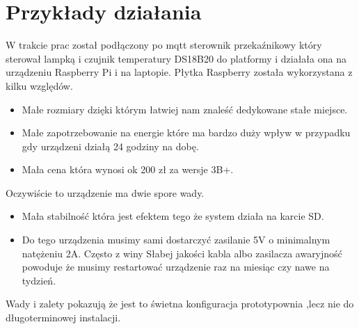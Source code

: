 \chapter{Przykłady działania}
W trakcie prac został podłączony po mqtt sterownik przekaźnikowy który sterował lampką i czujnik temperatury DS18B20 do platformy i działała ona na urządzeniu Raspberry Pi i na laptopie. Płytka Raspberry została wykorzystana z kilku względów. 
\begin{itemize}
    \item Małe rozmiary dzięki którym łatwiej nam znaleść dedykowane stałe miejsce.
    \item Małe zapotrzebowanie na energie które ma bardzo duży wpływ w przypadku gdy urządzeni działą 24 godziny na dobę.
    \item Mała cena która wynosi ok 200 zł za wersje 3B+.
\end{itemize}
Oczywiście to urządzenie ma dwie spore wady.
\begin{itemize}
    \item Mała stabilność która jest efektem tego że system działa na karcie SD.
    \item Do tego urządzenia musimy sami dostarczyć zasilanie 5V o minimalnym natężeniu 2A. Często z winy Słabej jakości kabla albo zasilacza awaryjność powoduje że musimy restartować urządzenie raz na miesiąc czy nawe na tydzień.
\end{itemize}
Wady i zalety pokazują że jest to świetna konfiguracja prototypownia ,lecz nie do długoterminowej instalacji. 